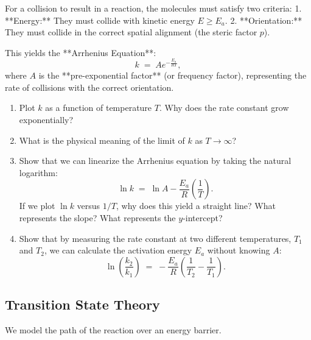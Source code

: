 \documentclass[12pt, a4paper]{book}
\begin{document}
\begin{explobox}
For a collision to result in a reaction, the molecules must satisfy two criteria:
1. **Energy:** They must collide with kinetic energy $E \ge E_a$.
2. **Orientation:** They must collide in the correct spatial alignment (the steric factor $p$).

This yields the **Arrhenius Equation**:
\[
  k \;= \; A e^{-\frac{E_a}{RT}},
\]
where $A$ is the **pre-exponential factor** (or frequency factor), representing the rate of collisions with the correct orientation.
\begin{enumerate}[label=(\alph*), leftmargin=*]
  \item Plot $k$ as a function of temperature $T$. Why does the rate constant grow exponentially?
  \item What is the physical meaning of the limit of $k$ as $T \to \infty$?
  \item Show that we can linearize the Arrhenius equation by taking the natural logarithm:
  \[
    \ln k \;=\; \ln A - \frac{E_a}{R}\left(\frac{1}{T}\right).
  \]
  If we plot $\ln k$ versus $1/T$, why does this yield a straight line? What represents the slope? What represents the $y$-intercept?
  \item Show that by measuring the rate constant at two different temperatures, $T_1$ and $T_2$, we can calculate the activation energy $E_a$ without knowing $A$:
  \[
    \ln\left( \frac{k_2}{k_1} \right) \;=\; -\frac{E_a}{R}\left( \frac{1}{T_2} - \frac{1}{T_1} \right).
  \]
\end{enumerate}
\end{explobox}

\subsection{Transition State Theory}

We model the path of the reaction over an energy barrier.
\end{document}
